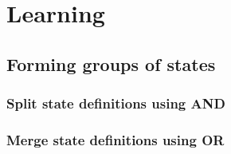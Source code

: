 \chapter{Learning} 
\label{chapter:learn}

\section{Forming groups of states}

	\subsection{Split state definitions using AND}
	
	\subsection{Merge state definitions using OR}